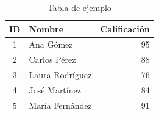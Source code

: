 \documentclass[letterpaper,10pt]{article}
\begin{document}
\begin{table}[H]
    \centering
    \begin{tabular}{|c|l|r|}
      \hline
      \textbf{ID} & \textbf{Nombre} & \textbf{Calificación} \\ \hline
      1 & Ana Gómez & 95 \\ \hline
      2 & Carlos Pérez & 88 \\ \hline
      3 & Laura Rodríguez & 76 \\ \hline
      4 & José Martínez & 84 \\ \hline
      5 & María Fernández & 91 \\ \hline
    \end{tabular}
    \caption{Tabla de ejemplo}
    \label{tab:ejemplo}
\end{table}
\end{document}
